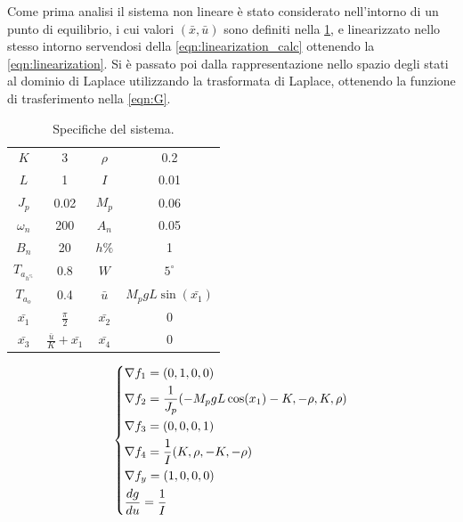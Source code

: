 \documentclass[a4paper]{article}
\newenvironment{eqsys}{\begin{equation}\begin{dcases}}{\end{dcases}\end{equation}}
\begin{document}
Come prima analisi il sistema non lineare è stato considerato nell’intorno di un punto di equilibrio, i cui valori $(\bar{x}, \bar{u})$ sono definiti nella \cref{table:ref_val}, e linearizzato nello stesso intorno servendosi della \cref{eqn:linearization_calc} ottenendo la \cref{eqn:linearization}.
Si è passato poi dalla rappresentazione nello spazio degli stati al dominio di Laplace utilizzando la trasformata di Laplace, ottenendo la funzione di trasferimento nella \cref{eqn:G}.

{\begin{table}[h!]

    \centering 

    \begin{tabular}{| c | c || c | c |}
        
        $K$ & 3 &
        $\rho$ & 0.2 \\
        $L$ & 1 &
        $I$ & 0.01 \\
        $J_p$ & 0.02 &
        $M_p$ & 0.06 \\
        $\omega_n$ & 200 &
        $A_n$ & 0.05 \\
        $B_n$ & 20 &
        $h\%$ & 1 \\
        $T_{a_{h^\%}}$ & 0.8 &
        $W$ & $5^\circ$ \\
        $T_{a_o}$ & 0.4 &
        $\bar{u}$  & $M_p g L \sin(\bar{x_1})$ \\
        $\bar{x_1}$  & $\frac{\pi}{2}$ &
        $\bar{x_2}$  & 0 \\
        $\bar{x_3}$  &$\frac{\bar{u}}{K} + \bar{x_1}$ &
        $\bar{x_4}$  & 0
        
        
    \end{tabular}
    \caption{Specifiche del sistema.}
        \label{table:ref_val}
\end{table}
}
\begin{eqsys}       
        \nabla f_1  = (0, 1, 0, 0) \\
        \nabla f_2  = \frac{1}{J_p} (-M_p g L \cos(x_1) - K, - \rho, K, \rho) \\
        \nabla f_3  =  (0, 0, 0, 1)\\
        \nabla f_4  =  \frac{1}{I} (K, \rho, -K, -\rho) \\
        \nabla f_y  =  (1, 0, 0, 0)  \\
        \frac{dg}{du}  =  \frac{1}{I}
        \label{eqn:linearization_calc}
    \end{eqsys}
\end{document}
